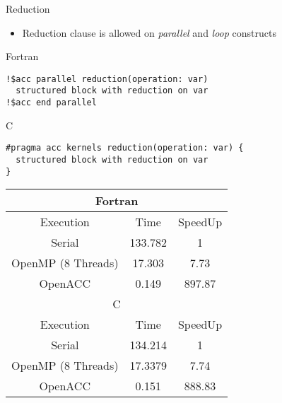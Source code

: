 \documentclass[c,mathserif,compress,xcolor=svgnames]{beamer}
\newenvironment{eblock}[0]
{
\begin{beamerboxesrounded}[upper=uppercol2,lower=lowercol2,shadow=true]}
{\end{beamerboxesrounded}}
\begin{document}
\begin{frame}{\small Reduction}
  \begin{itemize}
    \item Reduction clause is allowed on \textit{parallel} and \textit{loop} constructs
  \end{itemize}
  \begin{eblock}{Fortran}
    \begin{lstlisting}[basicstyle=\tiny\ttfamily,language=OmpFortran]
!$acc parallel reduction(operation: var)
  structured block with reduction on var
!$acc end parallel
    \end{lstlisting}
  \end{eblock}
  \begin{eblock}{C}
    \begin{lstlisting}[basicstyle=\tiny\ttfamily,language=OmpC]
#pragma acc kernels reduction(operation: var) {
  structured block with reduction on var
}
    \end{lstlisting}
  \end{eblock}

  \begin{eblock}{}
    \begin{center}
      \begin{tabular}{|c|c|c|}
        \hline
        \multicolumn{3}{|c|}{Fortran}\\
        \hline
        Execution & Time & SpeedUp \\
        \hline
        Serial & 133.782 & 1 \\
        OpenMP (8 Threads) & 17.303 & 7.73 \\
        OpenACC & 0.149 & 897.87 \\
        \hline
        \multicolumn{3}{|c|}{C}\\
        \hline
        Execution & Time & SpeedUp \\
        \hline
        Serial & 134.214 & 1 \\
        OpenMP (8 Threads) & 17.3379 & 7.74 \\
        OpenACC & 0.151 & 888.83 \\
        \hline
        
      \end{tabular}
    \end{center}
  \end{eblock}
\end{frame}
\end{document}
